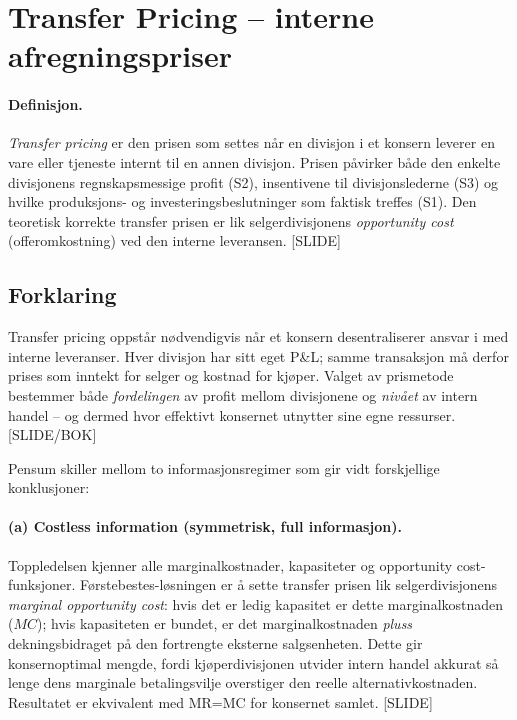 \section{Transfer Pricing -- interne afregningspriser}\label{thr:transfer-pricing}

\paragraph{Definisjon.} \emph{Transfer pricing} er den prisen som settes når en divisjon i et konsern leverer en vare eller tjeneste internt til en annen divisjon. Prisen påvirker både den enkelte divisjonens regnskapsmessige profit (S2), insentivene til divisjonslederne (S3) og hvilke produksjons- og investeringsbeslutninger som faktisk treffes (S1). Den teoretisk korrekte transfer prisen er lik selgerdivisjonens \emph{opportunity cost} (offeromkostning) ved den interne leveransen. [SLIDE]

\subsection*{Forklaring}

Transfer pricing oppstår nødvendigvis når et konsern desentraliserer ansvar i  med interne leveranser. Hver divisjon har sitt eget P\&L; samme transaksjon må derfor prises som inntekt for selger og kostnad for kjøper. Valget av prismetode bestemmer både \emph{fordelingen} av profit mellom divisjonene og \emph{nivået} av intern handel -- og dermed hvor effektivt konsernet utnytter sine egne ressurser. [SLIDE/BOK]

Pensum skiller mellom to informasjonsregimer som gir vidt forskjellige konklusjoner:

\paragraph{(a) Costless information (symmetrisk, full informasjon).} Toppledelsen kjenner alle marginalkostnader, kapasiteter og opportunity cost-funksjoner. Førstebestes-løsningen er å sette transfer prisen lik selgerdivisjonens \emph{marginal opportunity cost}: hvis det er ledig kapasitet er dette marginalkostnaden ($MC$); hvis kapasiteten er bundet, er det marginalkostnaden \emph{pluss} dekningsbidraget på den fortrengte eksterne salgsenheten. Dette gir konsernoptimal mengde, fordi kjøperdivisjonen utvider intern handel akkurat så lenge dens marginale betalingsvilje overstiger den reelle alternativkostnaden. Resultatet er ekvivalent med MR=MC for konsernet samlet. [SLIDE]

